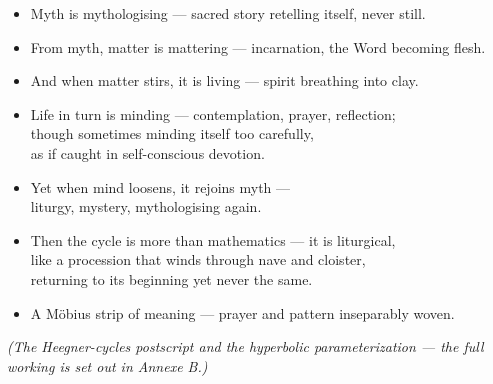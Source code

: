 \begin{itemize}[leftmargin=2cm,labelsep=1em]
    \item[\textbf{Eleanor:}] 
    Myth is mythologising — sacred story retelling itself, never still.

    \item[\textbf{Priest:}] 
    From myth, matter is mattering — incarnation, the Word becoming flesh.

    \item[\textbf{Eleanor:}] 
    And when matter stirs, it is living — spirit breathing into clay.

    \item[\textbf{Priest:}] 
    Life in turn is minding — contemplation, prayer, reflection; \\
    though sometimes minding itself too carefully, \\
    as if caught in self-conscious devotion.

    \item[\textbf{Eleanor:}] 
    Yet when mind loosens, it rejoins myth — \\
    liturgy, mystery, mythologising again.

    \item[\textbf{Priest:}] 
    Then the cycle is more than mathematics — it is liturgical, \\
    like a procession that winds through nave and cloister, \\
    returning to its beginning yet never the same.

    \item[\textbf{Eleanor:}] 
    A Möbius strip of meaning — prayer and pattern inseparably woven.
\end{itemize}



\textit{(The Heegner-cycles postscript and the hyperbolic parameterization --- the full working is set out in Annexe B.)}

